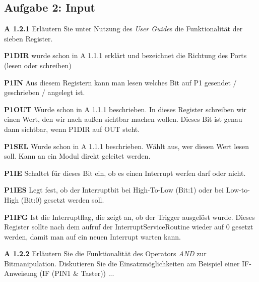 \subsection*{Aufgabe 2: Input}

\begin{description}

\item{\bfseries A 1.2.1} Erläutern Sie unter Nutzung des \emph{User Guide}s die Funktionalität der sieben Register.

\begin{description}

\item{\bfseries P1DIR} wurde schon in A 1.1.1 erklärt und bezeichnet die Richtung des Ports (lesen oder schreiben)

\item{\bfseries P1IN} Aus diesem Registern kann man lesen welches Bit auf P1 gesendet / geschrieben / angelegt ist.

\item{\bfseries P1OUT} Wurde schon in A 1.1.1 beschrieben. In dieses Register schreiben wir einen Wert, den wir nach außen sichtbar machen wollen. Dieses Bit ist genau dann sichtbar, wenn P1DIR auf OUT steht.

\item{\bfseries P1SEL} Wurde schon in A 1.1.1 beschrieben. Wählt aus, wer diesen Wert lesen soll. Kann an ein Modul direkt geleitet werden.

\item{\bfseries P1IE} Schaltet für dieses Bit ein, ob es einen Interrupt werfen darf oder nicht.

\item{\bfseries P1IES} Legt fest, ob der Interruptbit bei High-To-Low (Bit:1) oder bei Low-to-High (Bit:0) gesetzt werden soll.

\item{\bfseries P1IFG} Ist die Interruptflag, die zeigt an, ob der Trigger ausgelöst wurde. Dieses Register sollte nach dem aufruf der InterruptServiceRoutine wieder auf 0 gesetzt werden, damit man auf ein neuen Interrupt warten kann.

\end{description}

\item{\bfseries A 1.2.2} Erläutern Sie die Funktionalität des Operators \emph{AND} zur Bitmanipulation. Diskutieren Sie die Einsatzmöglichkeiten am Beispiel einer IF-Anweisung (IF (PIN1 \& Taster)) { ... }\\


\end{description}

